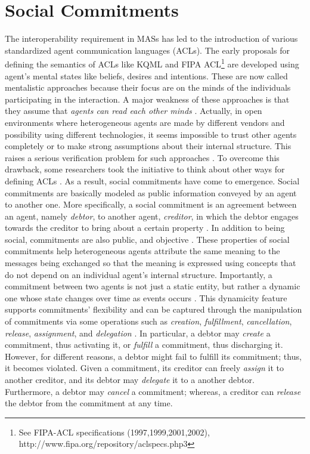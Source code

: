 \section{Social Commitments} \label{sec:social-commitment-cha2}
The interoperability requirement in MASs has led to the introduction of various standardized agent communication languages (ACLs). The early proposals for defining the semantics of ACLs like KQML \cite{Finin1994} and FIPA ACL\footnote{See FIPA-ACL specifications (1997,1999,2001,2002), http://www.fipa.org/repository/aclspecs.php3} are developed using agent's mental states like beliefs, desires and intentions. These are now called mentalistic approaches because their focus are on the minds of the individuals participating in the interaction. A major weakness of these approaches is that they assume that \textit{agents can read each other minds} \cite{Singh1998}. Actually, in open environments where heterogeneous agents are made by different vendors and possibility using different technologies, it seems impossible to trust other agents completely or to make strong assumptions about their internal structure. This raises a serious verification problem for such approaches \cite{Singh2008,Wooldridge2009}. To overcome this drawback, some researchers took the initiative to think about other ways for defining ACLs  \cite{Singh1998}. As a result, social commitments have come to emergence. Social commitments are basically modeled as public information conveyed by an agent to another one. More specifically, a social commitment is an agreement between an agent, namely \emph{debtor}, to another agent, \emph{creditor}, in which the debtor engages towards the creditor to bring about a certain property \cite{Castelfranchi1995,Singh2005}.
In addition to being social, commitments are also public, and objective \cite{Colombetti2000}. These properties of social commitments help heterogeneous agents attribute the same meaning to the messages being exchanged so that the meaning is expressed using concepts that do not depend on an individual agent's internal structure. Importantly, a commitment between two agents is not just a static entity, but rather a dynamic one whose state changes over time as events occurs \cite{Akin2013,Torroni2009}. This dynamicity feature supports commitments' flexibility and can be captured through the manipulation of commitments via some operations such as \emph{creation}, \emph{fulfillment},
\emph{cancellation}, \emph{release}, \emph{assignment}, and
\emph{delegation} \cite{Singh1999}. In particular, a debtor may \emph{create} a commitment, thus activating it, or \emph{fulfill} a commitment, thus discharging it. However, for different reasons, a debtor might fail to fulfill its commitment; thus, it becomes violated. Given a commitment, its creditor can freely \emph{assign} it to another creditor, and its debtor may \emph{delegate} it to a another debtor. Furthermore, a debtor may \emph{cancel} a commitment; whereas, a creditor can \emph{release} the debtor from the commitment at any time.

